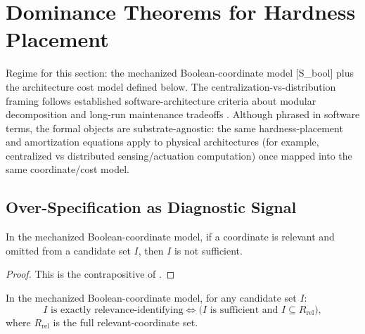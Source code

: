\section{Dominance Theorems for Hardness Placement}\label{sec:implications}

Regime for this section: the mechanized Boolean-coordinate model [S\_bool] plus the architecture cost model defined below. The centralization-vs-distribution framing follows established software-architecture criteria about modular decomposition and long-run maintenance tradeoffs \cite{parnas1972criteria, brooks1987no, bass2012software, shaw1996software}.
Although phrased in software terms, the formal objects are substrate-agnostic: the same hardness-placement and amortization equations apply to physical architectures (for example, centralized vs distributed sensing/actuation computation) once mapped into the same coordinate/cost model.

\subsection{Over-Specification as Diagnostic Signal}

\begin{corollary}\label{cor:overmodel-diagnostic-implication}
In the mechanized Boolean-coordinate model, if a coordinate is relevant and omitted from a candidate set $I$, then $I$ is not sufficient.
\end{corollary}

\begin{proof}
This is the contrapositive of .
\end{proof}

\begin{corollary}\label{cor:exact-identifiability}
In the mechanized Boolean-coordinate model, for any candidate set $I$:
\[
I \text{ is exactly relevance-identifying}
\iff
\bigl(I \text{ is sufficient and } I \subseteq R_{\mathrm{rel}}\bigr),
\]
where $R_{\mathrm{rel}}$ is the full relevant-coordinate set.
\end{corollary}

